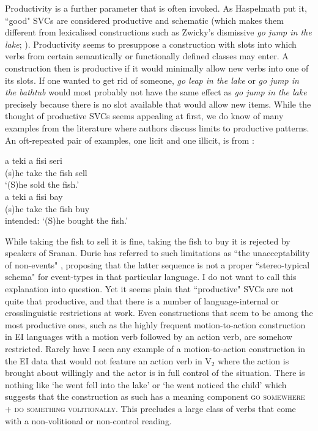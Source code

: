 Productivity is a further parameter that is often invoked. As Haspelmath put it, ``good" SVCs are considered productive and schematic (which makes them different from lexicalised constructions such as Zwicky's dismissive \textit{go jump in the lake}; \citealt[9]{zwicky1990we}). Productivity seems to presuppose a construction with slots into which verbs from certain semantically or functionally defined classes may enter. A construction then is productive if it would minimally allow new verbs into one of its slots. If one wanted to get rid of someone, \textit{go leap in the lake} or \textit{go jump in the bathtub} would most probably not have the same effect as \textit{go jump in the lake} precisely because there is no slot available that would allow new items. While the thought of productive SVCs seems appealing at first, we do know of many examples from the literature where authors discuss limits to productive patterns. An oft-repeated pair of examples, one licit and one illicit, is from \textcite{sebba1987syntax}:

\ea 
{}
\ea
\gll a teki a fisi seri \\
(s)he take the fish sell \\
\glft `(S)he sold the fish.' \\ 
\ex
\gll *a teki a fisi bay \\ 
(s)he take the fish buy \\
\glft intended: `(S)he bought the fish.'\\ 
\z
\z

While taking the fish to sell it is fine, taking the fish to buy it is rejected by speakers of Sranan. Durie has referred to such limitations as ``the unacceptability of non-events" \citep[327]{Durie1997}, proposing that the latter sequence is not a proper ``stereo-typical schema" for event-types in that particular language. I do not want to call this explanation into question. Yet it seems plain that ``productive" SVCs are not quite that productive, and that there is a number of language-internal or crosslinguistic restrictions at work. Even constructions that seem to be among the most productive ones, such as the highly frequent motion-to-action construction in EI languages with a motion verb followed by an action verb, are somehow restricted. Rarely have I seen any example of a motion-to-action construction in the EI data that would not feature an action verb in V$_2$ where the action is brought about willingly and the actor is in full control of the situation. There is nothing like `he went fell into the lake' or `he went noticed the child' which suggests that the construction as such has a meaning component \textsc{go somewhere + do something volitionally}. This precludes a large class of verbs that come with a non-volitional or non-control reading.

